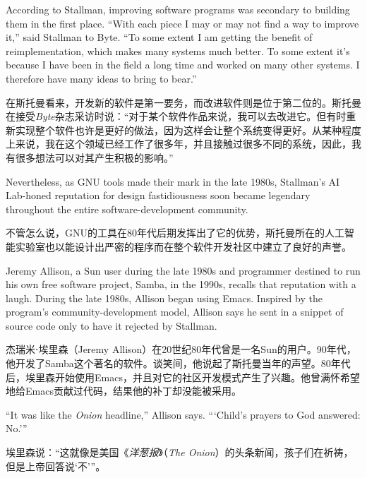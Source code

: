 \ifdefined\eng
According to Stallman, improving software programs was secondary to building them in the first place. ``With each piece I may or may not find a way to improve it,'' said Stallman to Byte. ``To some extent I am getting the benefit of reimplementation, which makes many systems much better. To some extent it's because I have been in the field a long time and worked on many other systems. I therefore have many ideas to bring to bear.''
\fi

\ifdefined\chs
在斯托曼看来，开发新的软件是第一要务，而改进软件则是位于第二位的。斯托曼在接受\textit{Byte}杂志采访时说：``对于某个软件作品来说，我可以去改进它。但有时重新实现整个软件也许是更好的做法，因为这样会让整个系统变得更好。从某种程度上来说，我在这个领域已经工作了很多年，并且接触过很多不同的系统，因此，我有很多想法可以对其产生积极的影响。''
\fi

\ifdefined\eng
Nevertheless, as GNU tools made their mark in the late 1980s, Stallman's AI Lab-honed reputation for design fastidiousness soon became legendary throughout the entire software-development community.
\fi

\ifdefined\chs
不管怎么说，GNU的工具在80年代后期发挥出了它的优势，斯托曼所在的人工智能实验室也以能设计出严密的程序而在整个软件开发社区中建立了良好的声誉。
\fi

\ifdefined\eng
Jeremy Allison, a Sun user during the late 1980s and programmer destined to run his own free software project, Samba, in the 1990s, recalls that reputation with a laugh. During the late 1980s, Allison began using Emacs. Inspired by the program's community-development model, Allison says he sent in a snippet of source code only to have it rejected by Stallman.
\fi

\ifdefined\chs
杰瑞米⋅埃里森（Jeremy Allison）在20世纪80年代曾是一名Sun的用户。90年代，他开发了Samba这个著名的软件。谈笑间，他说起了斯托曼当年的声望。80年代后，埃里森开始使用Emacs，并且对它的社区开发模式产生了兴趣。他曾满怀希望地给Emacs贡献过代码，结果他的补丁却没能被采用。
\fi

\ifdefined\eng
``It was like the \textit{Onion} headline,'' Allison says. ``\hspace{0.01in}`Child's prayers to God answered: No.'\hspace{0.01in}''
\fi

\ifdefined\chs
埃里森说：``这就像是美国《\textit{洋葱报}》（\textit{The Onion}）的头条新闻，孩子们在祈祷，但是上帝回答说`不'\hspace{0.01in}''。
\fi

